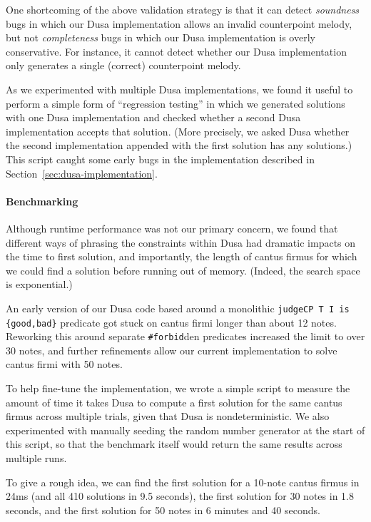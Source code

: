One shortcoming of the above validation strategy is that it can detect \emph{soundness} bugs in which our Dusa implementation allows an invalid counterpoint melody, but not \emph{completeness} bugs in which our Dusa implementation is overly conservative. For instance, it cannot detect whether our Dusa implementation only generates a single (correct) counterpoint melody.

As we experimented with multiple Dusa implementations, we found it useful to perform a simple form of ``regression testing'' in which we generated solutions with one Dusa implementation and checked whether a second Dusa implementation accepts that solution. (More precisely, we asked Dusa whether the second implementation appended with the first solution has any solutions.) This script caught some early bugs in the implementation described in Section~\ref{sec:dusa-implementation}.

\paragraph{Benchmarking}

Although runtime performance was not our primary concern, we found that different ways of phrasing the constraints within Dusa had dramatic impacts on the time to first solution, and importantly, the length of cantus firmus for which we could find a solution before running out of memory. (Indeed, the search space is exponential.)

An early version of our Dusa code based around a monolithic \verb|judgeCP T I is {good,bad}| predicate got stuck on cantus firmi longer than about 12 notes. Reworking this around separate \verb|#forbid|den predicates increased the limit to over 30 notes, and further refinements allow our current implementation to solve cantus firmi with 50 notes.

To help fine-tune the implementation, we wrote a simple script to measure the amount of time it takes Dusa to compute a first solution for the same cantus firmus across multiple trials, given that Dusa is nondeterministic. We also experimented with manually seeding the random number generator at the start of this script, so that the benchmark itself would return the same results across multiple runs.

To give a rough idea, we can find the first solution for a 10-note cantus firmus in 24ms (and all 410 solutions in 9.5 seconds), the first solution for 30 notes in 1.8 seconds, and the first solution for 50 notes in 6 minutes and 40 seconds.

